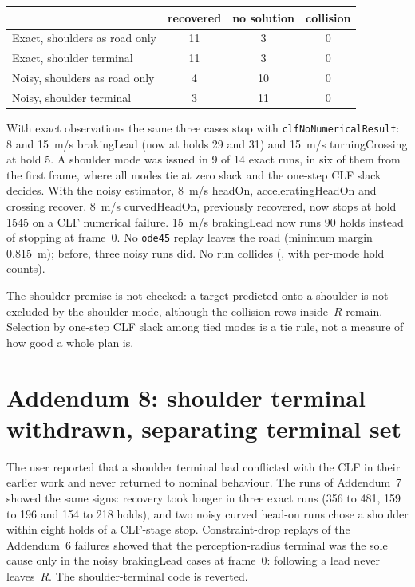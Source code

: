 \documentclass[11pt]{article}
\begin{document}
\begin{center}
\begin{tabular}{lccc}
\toprule
 & recovered & no solution & collision\\
\midrule
Exact, shoulders as road only & 11 & 3 & 0\\
Exact, shoulder terminal & 11 & 3 & 0\\
Noisy, shoulders as road only & 4 & 10 & 0\\
Noisy, shoulder terminal & 3 & 11 & 0\\
\bottomrule
\end{tabular}
\end{center}

With exact observations the same three cases stop with
\texttt{clfNoNumericalResult}: 8 and 15~m/s brakingLead (now at holds 29 and
31) and 15~m/s turningCrossing at hold 5. A shoulder mode was issued in 9 of
14 exact runs, in six of them from the first frame, where all modes tie at zero slack and the
one-step CLF slack decides. With the noisy estimator, 8~m/s headOn,
acceleratingHeadOn and crossing recover. 8~m/s curvedHeadOn, previously
recovered, now stops at hold 1545 on a CLF numerical failure. 15~m/s brakingLead now runs 90 holds
instead of stopping at frame~0. No \texttt{ode45} replay leaves the road
(minimum margin 0.815~m); before, three noisy runs did. No run collides
(, with per-mode hold counts).

The shoulder premise is not checked: a target predicted onto a shoulder is not
excluded by the shoulder mode, although the collision rows inside~$R$ remain.
Selection by one-step CLF slack among tied modes is a tie rule, not a measure
of how good a whole plan is.

\section{Addendum 8: shoulder terminal withdrawn, separating terminal set}
The user reported that a shoulder terminal had conflicted with the CLF in their
earlier work and never returned to nominal behaviour. The runs of Addendum~7
showed the same signs: recovery took longer in three exact runs (356 to 481,
159 to 196 and 154 to 218 holds), and two noisy curved head-on runs chose a
shoulder within eight holds of a CLF-stage stop. Constraint-drop replays of the
Addendum~6 failures showed that the perception-radius terminal was the sole
cause only in the noisy brakingLead cases at frame~0: following a lead never
leaves~$R$. The shoulder-terminal code is reverted.
\end{document}
